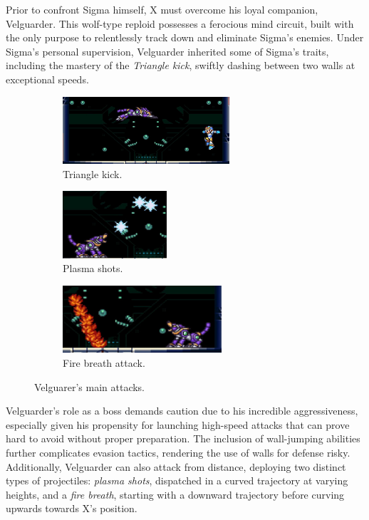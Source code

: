 Prior to confront Sigma himself, X must overcome his loyal companion, Velguarder. This wolf-type reploid possesses a ferocious mind circuit, built with the only purpose to relentlessly track down and eliminate Sigma's enemies. Under Sigma's personal supervision, Velguarder inherited some of Sigma's traits, including the mastery of the \emph{Triangle kick}, swiftly dashing between two walls at exceptional speeds.
\begin{figure}[htp]
	\centering
	\begin{subfigure}[t]{.52\linewidth}
		\centering
		\includegraphics[height=2.5cm]{figures/X1/Sigma_stages/Velguarder_leap_1.jpg}
		\caption{Triangle kick.}
	\end{subfigure}
	\begin{subfigure}[t]{0.40\linewidth}
		\centering
		\includegraphics[height=2.5cm]{figures/X1/Sigma_stages/Velguarder_plasma.jpg}
		\caption{Plasma shots.}
	\end{subfigure}
	\begin{subfigure}[t]{\linewidth}
		\centering
		\includegraphics[height=2.5cm]{figures/X1/Sigma_stages/Velguarder_fire.jpg}
		\caption{ Fire breath attack.}
	\end{subfigure}
	\caption{Velguarer's main attacks.}
\end{figure} 
Velguarder's role as a boss demands caution due to his incredible aggressiveness, especially given his propensity for launching high-speed attacks that can prove hard to avoid without proper preparation. The inclusion of wall-jumping abilities further complicates evasion tactics, rendering the use of walls for defense risky. Additionally, Velguarder can also attack from distance, deploying two distinct types of projectiles: \emph{plasma shots}, dispatched in a curved trajectory at varying heights, and a \emph{fire breath}, starting with a downward trajectory before curving upwards towards X's position.

